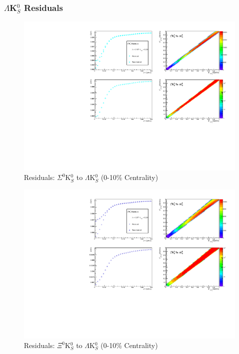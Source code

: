 \documentclass[../AnalysisNoteJBuxton.tex]{subfiles}
\begin{document}
\subsubsection{\texorpdfstring{$\Lambda$K$^{0}_{S}$}{TEXT} Residuals}
\label{Residuals_LamK0}

\begin{figure}[h]
  \centering
  \includegraphics[width=\textwidth]{9_AdditionalFigures/Figures/Residuals/LamK0/Residuals_LamK0_0010_Sig0K0_MomResCrctn_NonFlatBgdCrctn_SingleLamParam_ResidualsIncluded_UsingCoulombOnlyInterpCfs.pdf}
  \caption[Residuals: $\Sigma^{0}$K$^{0}_{S}$ to $\Lambda$K$^{0}_{S}$ (0-10\% Centrality)]{Residuals: $\Sigma^{0}$K$^{0}_{S}$ to $\Lambda$K$^{0}_{S}$ (0-10\% Centrality)}
  \label{fig:Res_LamK0_0010_Sig0K0}
\end{figure}


\begin{figure}[h]
  \centering
  \includegraphics[width=\textwidth]{9_AdditionalFigures/Figures/Residuals/LamK0/Residuals_LamK0_0010_Xi0K0_MomResCrctn_NonFlatBgdCrctn_SingleLamParam_ResidualsIncluded_UsingCoulombOnlyInterpCfs.pdf}
  \caption[Residuals: $\Xi^{0}$K$^{0}_{S}$ to $\Lambda$K$^{0}_{S}$ (0-10\% Centrality)]{Residuals: $\Xi^{0}$K$^{0}_{S}$ to $\Lambda$K$^{0}_{S}$ (0-10\% Centrality)}
  \label{fig:Res_LamK0_0010_Xi0K0}
\end{figure}
\end{document}

